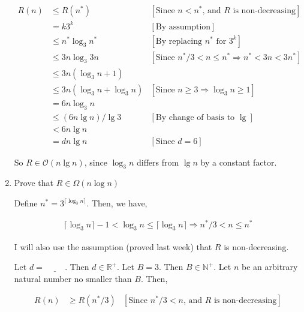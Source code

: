 \documentclass[12pt]{article}
\begin{document}
\begin{mdframed}
\begin{enumerate}[1.]
        \begin{mdframed}
        \begin{align}
        R(n) &\leq R(n^*)  & [\text{Since $n < n^*$, and $R$ is non-decreasing}]\\
        &= k3^k & [\text{By assumption}]\\
        &\leq n^* \log_3 n^* & [\text{By replacing $n^*$ for $3^k$}]\\
        &\leq 3n \log_3 3n  & [\text{Since $n^*/3 < n \leq n^* \Rightarrow n^* < 3n < 3n^*$}]\\
        &\leq 3n(\log_3 n + 1)\\
        &\leq 3n(\log_3 n + \log_3 n) & [\text{Since $n \geq 3 \Rightarrow \log_3 n \geq 1$}]\\
        &= 6n \log_3 n\\
        &\leq (6n \lg n)/\lg 3 & [\text{By change of basis to $\lg$}]\\
        &< 6n \lg n\\
        &= dn \lg n & [\text{Since $d = 6$}]
        \end{align}

        \end{mdframed}

        So $R \in \mathcal{O}(n \lg n)$, since $\log_3 n$ differs from $\lg n$ by a constant factor.

        \item Prove that $R \in \Omega(n \log n)$

        \begin{mdframed}

        Define $n^* = 3^{\lceil \log_3 n \rceil}$. Then, we have,

        \begin{align}
            \lceil \log_3 n \rceil - 1 < \log_3 n \leq \lceil \log_3 n \rceil \Rightarrow n^*/3 < n \leq n^*
        \end{align}

        I will also use the assumption (proved last week) that $R$ is non-decreasing.

        \bigskip

        Let $d = \underline{\hspace{1cm}}$. Then $d \in \mathbb{R}^+$. Let $B = 3$. Then $B \in \mathbb{N}^+$. Let
        $n$ be an arbitrary natural number no smaller than $B$. Then,

        \begin{align}
        R(n) &\geq R(n^*/3) & [\text{Since $n^*/3 < n$, and $R$ is non-decreasing}]
        \end{align}

        \end{mdframed}
    \end{enumerate}

\end{mdframed}
\end{document}
